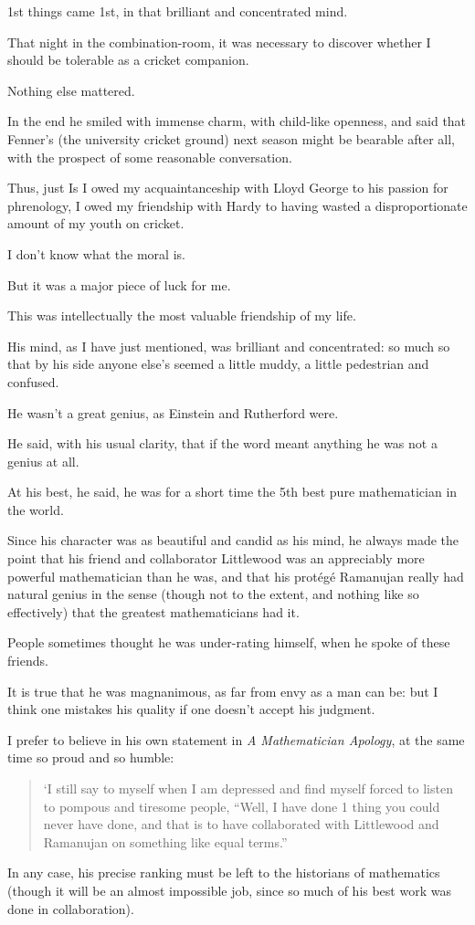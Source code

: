 \documentclass{article}
\numberwithin{equation}{section}
\begin{document}
1st things came 1st, in that brilliant and concentrated mind.

%
That night in the combination-room, it was necessary to discover whether I should be tolerable as a cricket companion.

Nothing else mattered.

In the end he smiled with immense charm, with child-like openness, and said that Fenner's (the university cricket ground) next season might be bearable after all, with the prospect of some reasonable conversation.

%
Thus, just Is I owed my acquaintanceship with Lloyd George to his passion for phrenology, I owed my friendship with Hardy to having wasted a disproportionate amount of my youth on cricket.

I don't know what the moral is.

But it was a major piece of luck for me.

This was intellectually the most valuable friendship of my life.

His mind, as I have just mentioned, was brilliant and concentrated: so much so that by his side anyone else's seemed a little muddy, a little pedestrian and confused.

He wasn't a great genius, as Einstein and Rutherford were.

He said, with his usual clarity, that if the word meant anything he was not a genius at all.

At his best, he said, he was for a short time the 5th best pure mathematician in the world.

Since his character was as beautiful and candid as his mind, he always made the point that his friend and collaborator Littlewood was an appreciably more powerful mathematician than he was, and that his prot\'eg\'e Ramanujan really had natural genius in the sense (though not to the extent, and nothing like so effectively) that the greatest mathematicians had it.

%
People sometimes thought he was under-rating himself, when he spoke of these friends.

It is true that he was magnanimous, as far from envy as a man can be: but I think one mistakes his quality if one doesn't accept his judgment.

I prefer to believe in his own statement in \textit{A Mathematician Apology}, at the same time so proud and so humble:
\begin{quotation}
    `I still say to myself when I am depressed and find myself forced to listen to pompous and tiresome people, ``Well, I have done 1 thing you could never have done, and that is to have collaborated with Littlewood and Ramanujan on something like equal terms.''
\end{quotation}
In any case, his precise ranking must be left to the historians of mathematics (though it will be an almost impossible job, since so much of his best work was done in collaboration).
\end{document}
